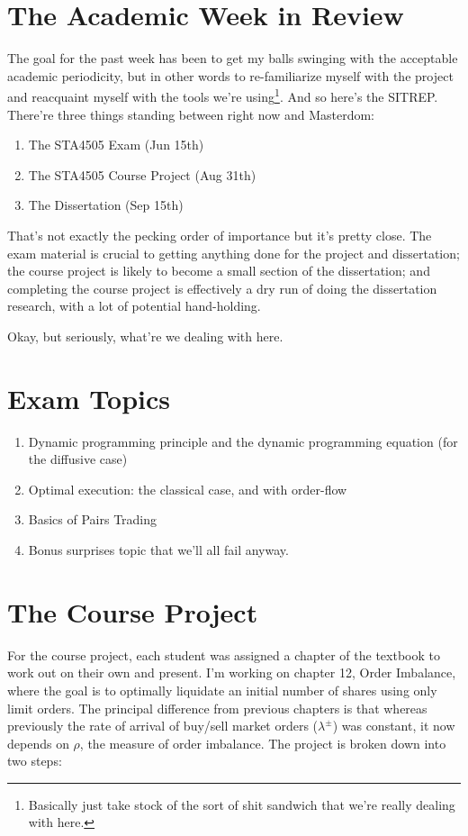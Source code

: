 \documentclass[12pt]{article}
\begin{document}
\section*{The Academic Week in Review}
The goal for the past week has been to get my balls swinging with the acceptable academic periodicity, but in other words to re-familiarize myself with the project and reacquaint myself with the tools we're using\footnote{Basically just take stock of the sort of shit sandwich that we're really dealing with here.}. And so here's the SITREP. There're three things standing between right now and Masterdom:
\begin{enumerate}
\item The STA4505 Exam (Jun 15th)
\item The STA4505 Course Project (Aug 31th)
\item The Dissertation (Sep 15th)
\end{enumerate}
That's not exactly the pecking order of importance but it's pretty close. The exam material is crucial to getting anything done for the project and dissertation; the course project is likely to become a small section of the dissertation; and completing the course project is effectively a dry run of doing the dissertation research, with a lot of potential hand-holding.

Okay, but seriously, what're we dealing with here.

\section*{Exam Topics}
\begin{enumerate}
\item Dynamic programming principle and the dynamic programming equation (for the diffusive case)
\item Optimal execution: the classical case, and with order-flow
\item Basics of Pairs Trading
\item Bonus surprises topic that we'll all fail anyway.
\end{enumerate}

\section*{The Course Project}
For the course project, each student was assigned a chapter of the textbook to work out on their own and present. I'm working on chapter 12, Order Imbalance, where the goal is to optimally liquidate an initial number of shares using only limit orders. The principal difference from previous chapters is that whereas previously the rate of arrival of buy/sell market orders ($\lambda^{\pm}$) was constant, it now depends on $\rho$, the measure of order imbalance. The project is broken down into two steps:
\end{document}

